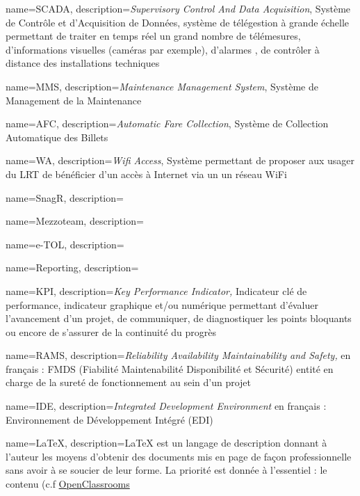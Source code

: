 {
	name=SCADA,
	description={\textit{Supervisory Control And Data Acquisition}, Système de Contrôle et d'Acquisition de Données, système de télégestion à grande échelle permettant de traiter en temps réel un grand nombre de télémesures, d'informations visuelles (caméras par exemple), d'alarmes , de contrôler à distance des installations techniques}
}

{
	name=MMS,
	description={\textit{Maintenance Management System}, Système de Management de la Maintenance}
}

{
	name=AFC,
	description={\textit{Automatic Fare Collection}, Système de Collection Automatique des Billets}
}

{
	name=WA,
	description={\textit{Wifi Access}, Système permettant de proposer aux usager du LRT de bénéficier d'un accès à Internet via un un réseau WiFi}
}

{
	name=SnagR,
	description={}
}
	

{
	name=Mezzoteam,
	description={}
}

{
	name=e-TOL,
	description={}
}

{
	name=Reporting,
	description={}
}

{
	name=KPI,
	description={\textit{Key Performance Indicator,} Indicateur clé de performance, indicateur graphique et/ou numérique permettant d'évaluer l'avancement d'un projet, de communiquer, de diagnostiquer les points bloquants ou encore de s'assurer de la continuité du progrès}
}

{
	name=RAMS,
	description={\textit{Reliability Availability Maintainability and Safety,} en français : FMDS (Fiabilité Maintenabilité Disponibilité et Sécurité) entité en charge de la sureté de fonctionnement au sein d'un projet}
}

{
	name=IDE,
	description={\textit{Integrated Development Environment} en français :  Environnement de Développement Intégré (EDI) }
}

{
	name=LaTeX,
	description={LaTeX est un langage de description donnant à l'auteur les moyens d'obtenir des documents mis en page de façon professionnelle sans avoir à se soucier de leur forme. La priorité est donnée à l'essentiel : le contenu (c.f \href{https://openclassrooms.com/fr/courses/1617396-redigez-des-documents-de-qualite-avec-latex/1617565-quest-ce-que-latex}{OpenClassrooms}}
}

